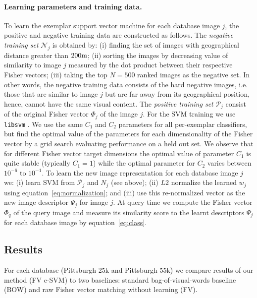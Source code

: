 \documentclass[10pt,twocolumn,letterpaper]{article}
\begin{document}
      \paragraph{Learning parameters and training data.}
         To learn the exemplar support vector machine for each database image $j$, the positive and negative training data are constructed as follows. The \emph{negative training set} $\mathcal N_j$ is obtained by: (i) finding the set of images with geographical distance greater than $200{\rm m}$; (ii)  sorting the images by decreasing value of similarity to image $j$ measured by the dot product between their respective Fisher vectors; (iii) taking the top $N=500$ ranked images as the negative set. In other words, the negative training data consists of the hard negative images, i.e. those that are similar to image $j$ but are far away from its geographical position, hence, cannot have the same visual content. The \emph{positive training set} $\mathcal P_j$
         consist of the original Fisher vector $\Phi_j$ of the image $j$.
         For the SVM training we use {\tt libsvm} \cite{libsvm}.
         We use the same $C_1$ and $C_2$ parameters for all per-exemplar classifiers, but find the optimal value of the parameters for each dimensionality of the Fisher vector by a grid search evaluating performance on a held out set.
         We observe that for different Fisher vector target dimensions the optimal value of parameter $C_1$ is quite stable (typically $C_1=1$) while the optimal parameter for $C_2$ varies between $10^{-6}$ to $10^{-1}$.
         To learn the new image representation for each database image $j$ we: (i) learn SVM from $\mathcal P_j$ and $N_j$ (see above); (ii) $L2$ normalize the learned $w_j$ using equation~\eqref{eq:normalization}; and (iii) use this re-normalized vector as the new image descriptor $\Psi_j$ for image $j$. At query time we compute the Fisher vector $\Phi_q$ of the query image and measure its similarity score to the learnt descriptors $\Psi_j$ for each database image by equation~\eqref{eq:class}.
   

   \subsection{Results}    
      For each database (Pittsburgh 25k and Pittsburgh 55k) we compare results of our method (FV e-SVM) to two baselines: standard bag-of-visual-words baseline (BOW) and raw Fisher vector matching without learning (FV). 
\end{document}
